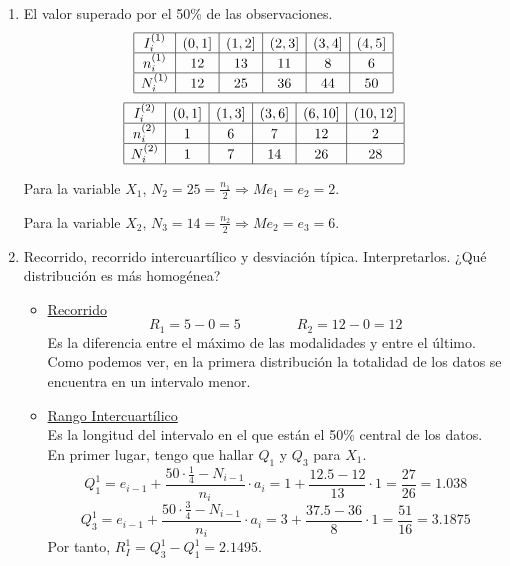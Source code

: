\begin{ejercicio}
\begin{enumerate}
        \item El valor superado por el 50\% de las observaciones.
        \begin{equation*}
            \begin{array}{|c|c|c|c|c|c|}
                \hline
                I_i^{(1)} & (0,1] & (1,2] & (2,3] & (3,4] & (4,5]  \\ \hline
                n_i^{(1)} & 12& 13 & 11 & 8 & 6 \\ \hline 
                N_i^{(1)} & 12& 25 & 36 & 44 & 50 \\ \hline 
            \end{array}
        \end{equation*}
        \begin{equation*}
            \begin{array}{|c|c|c|c|c|c|}
                \hline
                I_i^{(2)} & (0,1] & (1,3] & (3,6] & (6,10] & (10,12]  \\ \hline
                n_i^{(2)} & 1& 6 & 7 & 12 & 2 \\ \hline 
                N_i^{(2)} & 1& 7 & 14 & 26 & 28 \\ \hline 
            \end{array}
        \end{equation*}

        Para la variable $X_1$, $N_2=25=\frac{n_1}{2} \Longrightarrow Me_1 = e_2 = 2$.
        
        Para la variable $X_2$, $N_3=14=\frac{n_2}{2} \Longrightarrow Me_2 = e_3 = 6$.

        \item Recorrido, recorrido intercuartílico y desviación típica. Interpretarlos. ¿Qué distribución es más homogénea?
        \begin{itemize}
            \item \underline{Recorrido}
            $$R_1 = 5-0 = 5 \qquad \qquad R_2 = 12-0 = 12$$
            Es la diferencia entre el máximo de las modalidades y entre el último. Como podemos ver, en la primera distribución la totalidad de los datos se encuentra en un intervalo menor.
            \item \underline{Rango Intercuartílico}\\
            Es la longitud del intervalo en el que están el 50\% central de los datos.\\
            En primer lugar, tengo que hallar $Q_1$ y $Q_3$ para $X_1$.
            $$Q_1^1 = e_{i-1}+\frac{50\cdot \frac{1}{4} - N_{i-1}}{n_i} \cdot a_i
            = 1+\frac{12.5 - 12}{13} \cdot 1 = \frac{27}{26} = 1.038$$
            $$Q_3^1 = e_{i-1}+\frac{50\cdot \frac{3}{4} - N_{i-1}}{n_i} \cdot a_i
            = 3+\frac{37.5 - 36}{8} \cdot 1 = \frac{51}{16} = 3.1875$$
            Por tanto, $R_I^1 = Q_3^1 - Q_1^1 = 2.1495$.\\


\end{itemize}
\end{enumerate}
\end{ejercicio}
